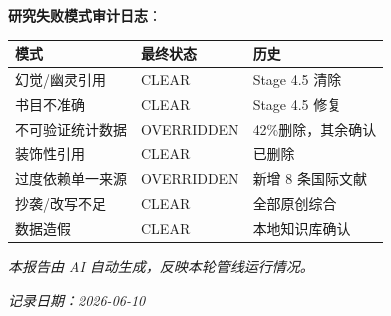 \documentclass[12pt,a4paper]{article}
\begin{document}
\textbf{研究失败模式审计日志}：

\begin{tabular}{lll}
\hline
\textbf{模式} & \textbf{最终状态} & \textbf{历史} \\
\hline
幻觉/幽灵引用 & CLEAR & Stage 4.5 清除 \\
书目不准确 & CLEAR & Stage 4.5 修复 \\
不可验证统计数据 & OVERRIDDEN & 42\%删除，其余确认 \\
装饰性引用 & CLEAR & 已删除 \\
过度依赖单一来源 & OVERRIDDEN & 新增 8 条国际文献 \\
抄袭/改写不足 & CLEAR & 全部原创综合 \\
数据造假 & CLEAR & 本地知识库确认 \\
\hline
\end{tabular}

\vfill
\noindent\textit{本报告由 AI 自动生成，反映本轮管线运行情况。}

\noindent\textit{记录日期：2026-06-10}
\end{document}
